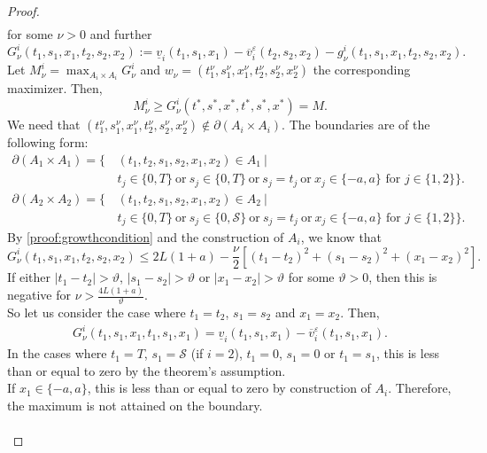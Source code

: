 \documentclass[10pt,a4paper]{amsart}
\begin{document}
\begin{proof}
\begin{align*}
    \end{align*}
    for some $\nu>0$ and further
    \begin{equation*}
        G_\nu ^i (t_1,s_1,x_1,t_2,s_2,x_2) := \underline{v}_i(t_1,s_1,x_1)-\overline{v}^\varepsilon_i(t_2,s_2,x_2)- g_\nu^i(t_1,s_1,x_1,t_2,s_2,x_2).
    \end{equation*}
    Let $M_\nu ^i=\max_{A_i \times A_i} G_\nu^i$ and $w_\nu=(t_1^\nu,s_1^\nu,x_1^\nu,t_2^\nu,s_2^\nu,x_2^\nu)$ the corresponding maximizer. Then,
    \begin{equation*}
        M_\nu ^i \geq G_\nu^i(t^*,s^*,x^*,t^*,s^*,x^*)=M.
    \end{equation*}
    We need that $(t_1^\nu,s_1^\nu,x_1^\nu,t_2^\nu,s_2^\nu,x_2^\nu) \notin \partial (A_i \times A_i)$. %
    The boundaries are of the following form: 
   \begin{align*}
\partial (A_1 \times A_1) =  \big\{\, &(t_1, t_2, s_1, s_2, x_1, x_2) \in A_1 \ \big| \\
& t_j \in \{0,T\} \ \text{or} \ s_j \in \{0,T\} \ \text{or} \ s_j = t_j \ \text{or} \ x_j \in \{-a,a\} \text{ for } j \in \{1,2\}\big\}.
\end{align*}
\begin{align*}
\partial (A_2 \times A_2) =  \big\{\, &(t_1, t_2, s_1, s_2, x_1, x_2) \in A_2 \ \big| \\
& t_j \in \{0,T\} \ \text{or} \ s_j \in \{0,\mathcal{S}\} \ \text{or} \ s_j = t_j \ \text{or} \ x_j \in \{-a,a\} \text{ for } j \in \{1,2\}\big\}.
\end{align*}
    By \eqref{proof:growthcondition} and the construction of $A_i$, we know that
    \begin{equation*}
         G_\nu ^i (t_1,s_1,x_1,t_2,s_2,x_2) \leq 2L (1+a)- \frac{\nu}{2}\left[(t_1-t_2)^2+(s_1-s_2)^2+(x_1-x_2)^2\right].
    \end{equation*}
    If either $|t_1-t_2|>\vartheta$, $|s_1-s_2|>\vartheta$ or $|x_1-x_2|>\vartheta$ for some $\vartheta>0$, then this is negative for $\nu > \frac{4L(1+a)}{\vartheta}$. \\So let us consider the case where $t_1=t_2$, $s_1=s_2$ and $x_1=x_2$.
    Then,
    \begin{align*}
             G_\nu ^i (t_1,s_1,x_1,t_1,s_1,x_1) =  \underline{v}_i(t_1,s_1,x_1)-\overline{v}^\varepsilon_i(t_1,s_1,x_1).
    \end{align*}
    In the cases where $t_1=T$,  $s_1=\mathcal{S}$ (if $i=2$), $t_1=0$, $s_1=0$ or $t_1=s_1$, this is less than or equal to zero by the theorem's assumption. \\If $x_1 \in \{-a,a\}$, this is less than or equal to zero by construction of $A_i$. Therefore, the maximum is not attained on the boundary. \\ \ \\

\end{proof}
\end{document}
